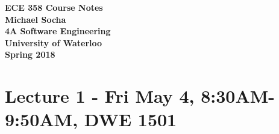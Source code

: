 \documentclass[12pt,titlepage]{article}
\begin{document}
  \begin{titlepage}
    \vspace*{\fill}
    \centering

    \textbf{\Huge ECE 358 Course Notes} \\ [1em]
    \textbf{\Large Michael Socha} \\ [1em]
    \textbf{\large 4A Software Engineering} \\
    \textbf{\large University of Waterloo} \\
    \textbf{\large Spring 2018} \\
    \vspace*{\fill}
  \end{titlepage}

  \newpage 

  \section*{Lecture 1 - Fri May 4, 8:30AM-9:50AM, DWE 1501}
\end{document}
